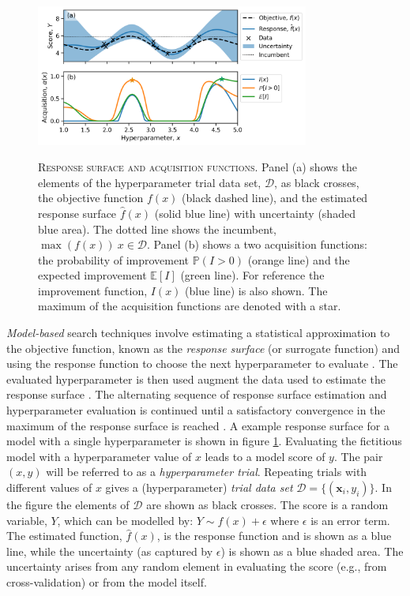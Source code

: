 \begin{figure}
    \centering
    \caption[Response surface and acquisition functions]{\textsc{Response surface and acquisition functions}. Panel (a) shows the elements of the hyperparameter trial data set, $\mathcal{D}$, as black crosses, the objective function $f(x)$ (black dashed line), and the estimated response surface $\hat{f}(x)$ (solid blue line) with uncertainty (shaded blue area). The dotted line shows the incumbent, $\max{\left(f(x)\right)}\ x\in \mathcal{D}$. Panel (b) shows a two acquisition functions: the probability of improvement $\mathbb{P}(I>0)$ (orange line) and the expected improvement $\mathbb{E}[I]$ (green line). For reference the improvement function, $I(x)$ (blue line) is also shown. The maximum of the acquisition functions are denoted with a star. }
    \includegraphics[width=0.8\textwidth]{chapters/msm_optimization/figures/response_surface_explainer.png}
    \label{fig:msm_rsm_explainer}
\end{figure}

\emph{Model-based} search techniques involve estimating a statistical approximation to the objective function, known  as the \emph{response surface} (or surrogate function) and using the response function to choose the next hyperparameter to evaluate \cite{hutterSequentialModelbasedOptimization2011}. The evaluated hyperparameter is then used augment the data used to estimate the response surface \cite{hutterSequentialModelbasedOptimization2011}. The alternating sequence of response surface estimation and hyperparameter evaluation is continued until a satisfactory convergence in the maximum of the response surface is reached \cite{hutterSequentialModelbasedOptimization2011}. A example response surface for a model with a single hyperparameter is shown in figure \ref{fig:msm_rsm_explainer}. Evaluating the fictitious model with a hyperparameter value of $x$ leads to a model score of $y$. The pair $(x, y)$ will be referred to as a \emph{hyperparameter trial}. Repeating trials with different values of $x$ gives a (hyperparameter) \emph{trial data set}  $\mathcal{D}=\{(\mathbf{x}_{i}, y_{i})\}$. In the figure the elements of $\mathcal{D}$ are shown as black crosses. The score is a random variable, $Y$, which can be modelled by: $Y \sim f(x) + \epsilon$ where $\epsilon$ is an error term. The estimated function, $\hat{f}(x)$, is the response function and is shown as a blue line, while the uncertainty (as captured by $\epsilon$) is shown as a blue shaded area. The uncertainty arises from any random element in evaluating the score (e.g., from cross-validation) or from the model itself.  

